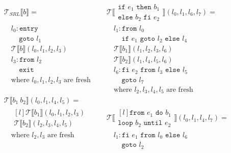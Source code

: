 \begin{figure}
  $$\begin{aligned}
    & \mathcal{T}_{SRL}\llbracket b\rrbracket =        &  \quad  & \mathcal{T}\llbracket\begin{matrix}\texttt{if }e_1\texttt{ then }b_1\\\texttt{else }b_2\texttt{ fi }e_2\end{matrix}\rrbracket(l_0,l_1,l_6,l_7) = \\
    & \quad l_0: \texttt{entry}                          &         & \quad l_1:  \texttt{from }l_0 \\
    & \quad \ \ \ \ \ \texttt{goto }l_1                      &         & \quad \ \ \ \ \ \texttt{if }e_1\texttt{ goto }l_2\texttt{ else }l_4\\
    & \quad \mathcal{T}\llbracket b\rrbracket(l_0,l_1,l_2,l_3) & & \quad \mathcal{T}\llbracket b_1\rrbracket(l_1,l_2,l_3,l_6)\\
    & \quad l_3: \texttt{from }l_2                       &         & \quad \mathcal{T}\llbracket b_2\rrbracket(l_1,l_4,l_5,l_6)\\
    & \quad \ \ \ \ \ \texttt{exit}                          &         & \quad l_6: \texttt{fi }e_2\texttt{ from }l_3\texttt{ else }l_5\\
    & \quad \text{where $l_0,l_1,l_2,l_3$ are fresh}   &         & \quad \ \ \ \ \ \texttt{goto }l_7\\
    &                                                  &         & \quad \text{where $l_2,l_3,l_4,l_5$ are fresh}\\
    & \mathcal{T}\llbracket b_1\ b_2\rrbracket(l_0,l_1,l_4,l_5) = \\
    & \quad \begin{matrix*}[l]\mathcal{T}\llbracket b_1\rrbracket(l_0,l_1,l_2,l_3)\\\mathcal{T}\llbracket b_2\rrbracket(l_2,l_3,l_4,l_5)\end{matrix*} & & \mathcal{T}\llbracket\begin{matrix*}[l]\texttt{from }e_1\texttt{ do }b_1\\\texttt{loop }b_2\texttt{ until }e_2\end{matrix*}\rrbracket(l_0,l_1,l_4,l_7) = \\
    & \quad \text{where $l_2,l_3$ are fresh}                     & & \quad l_1: \texttt{fi }e_1\texttt{ from }l_0\texttt{ else }l_6\\
    &                                                            & & \quad \ \ \ \ \ \texttt{goto }l_2\\

\end{aligned}$$
\end{figure}
